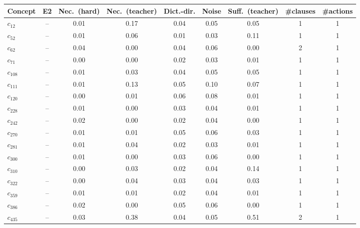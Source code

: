 \begin{tabular}{lcccccccc}
\toprule
Concept & E2 & Nec.\ (hard) & Nec.\ (teacher) & Dict.-dir. & Noise & Suff.\ (teacher) & \#clauses & \#actions \\
\midrule
$c_{12}$ & -- & 0.01 & 0.17 & 0.04 & 0.05 & 0.05 & 1 & 1 \\
$c_{52}$ & -- & 0.01 & 0.06 & 0.01 & 0.03 & 0.11 & 1 & 1 \\
$c_{62}$ & -- & 0.04 & 0.00 & 0.04 & 0.06 & 0.00 & 2 & 1 \\
$c_{71}$ & -- & 0.00 & 0.00 & 0.02 & 0.03 & 0.01 & 1 & 1 \\
$c_{108}$ & -- & 0.01 & 0.03 & 0.04 & 0.05 & 0.05 & 1 & 1 \\
$c_{111}$ & -- & 0.01 & 0.13 & 0.05 & 0.10 & 0.07 & 1 & 1 \\
$c_{120}$ & -- & 0.00 & 0.01 & 0.06 & 0.08 & 0.01 & 1 & 1 \\
$c_{228}$ & -- & 0.01 & 0.00 & 0.03 & 0.04 & 0.01 & 1 & 1 \\
$c_{242}$ & -- & 0.02 & 0.00 & 0.02 & 0.04 & 0.00 & 1 & 1 \\
$c_{270}$ & -- & 0.01 & 0.01 & 0.05 & 0.06 & 0.03 & 1 & 1 \\
$c_{281}$ & -- & 0.01 & 0.04 & 0.02 & 0.03 & 0.01 & 1 & 1 \\
$c_{300}$ & -- & 0.01 & 0.00 & 0.03 & 0.06 & 0.00 & 1 & 1 \\
$c_{310}$ & -- & 0.00 & 0.03 & 0.02 & 0.04 & 0.14 & 1 & 1 \\
$c_{322}$ & -- & 0.00 & 0.04 & 0.03 & 0.04 & 0.03 & 1 & 1 \\
$c_{359}$ & -- & 0.01 & 0.01 & 0.02 & 0.04 & 0.01 & 1 & 1 \\
$c_{386}$ & -- & 0.02 & 0.00 & 0.05 & 0.06 & 0.00 & 1 & 1 \\
$c_{435}$ & -- & 0.03 & 0.38 & 0.04 & 0.05 & 0.51 & 2 & 1 \\
\bottomrule
\end{tabular}